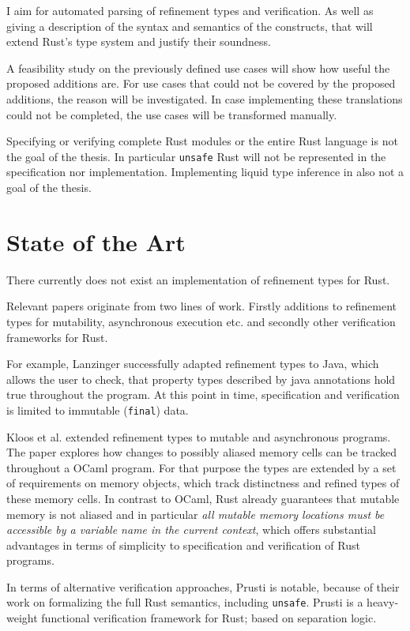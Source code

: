 \documentclass[11pt]{article}
\newcommand{\code}[1]{\texttt{#1}}
\begin{document}
I aim for automated parsing of refinement types and verification. As well as giving a description of the syntax and semantics of the constructs, that will extend Rust's type system and justify their soundness.

A feasibility study on the previously defined use cases will show how useful the proposed additions are. For use cases that could not be covered by the proposed additions, the reason will be investigated.
In case implementing these translations could not be completed, the use cases will be transformed manually.

Specifying or verifying complete Rust modules or the entire Rust language is not the goal of the thesis. In particular \code{unsafe} Rust will not be represented in the specification nor implementation. Implementing liquid type inference in also not a goal of the thesis.

\section{State of the Art}

There currently does not exist an implementation of refinement types for Rust.

Relevant papers originate from two lines of work. Firstly additions to refinement types for mutability, asynchronous execution etc. and secondly other verification frameworks for Rust.

For example, Lanzinger \cite{lanzinger_property_2021} successfully adapted refinement types to Java, which allows the user to check, that property types described by java annotations hold true throughout the program. At this point in time, specification and verification is limited to immutable (\code{final}) data.

Kloos et al. \cite{kloos_asynchronous_2015} extended refinement types to mutable and asynchronous programs. The paper explores how changes to possibly aliased memory cells can be tracked throughout a OCaml program. For that purpose the types are extended by a set of requirements on memory objects, which track distinctness and refined types of these memory cells. In contrast to OCaml, Rust already guarantees that mutable memory is not aliased and in particular \textit{all mutable memory locations must be accessible by a variable name in the current context}, which offers substantial advantages in terms of simplicity to specification and verification of Rust programs.

In terms of alternative verification approaches, Prusti\cite{astrauskas_leveraging_2019} is notable, because of their work on formalizing the full Rust semantics, including \code{unsafe}. Prusti is a heavy-weight functional verification framework for Rust; based on separation logic.
\end{document}
